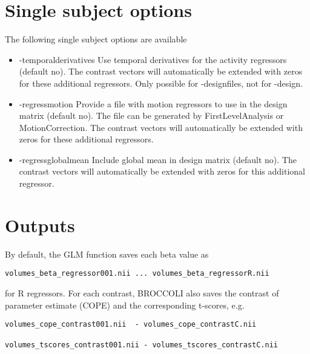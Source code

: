 \section{Single subject options}

The following single subject options are available

\begin{itemize}

\item -temporalderivatives
\newline \newline Use temporal derivatives for the activity regressors (default no). The contrast vectors will automatically be extended with zeros for these additional regressors. Only possible for -designfiles, not for -design.

\item -regressmotion
\newline \newline Provide a file with motion regressors to use in the design matrix (default no). The file can be generated by FirstLevelAnalysis or MotionCorrection. The contrast vectors will automatically be extended with zeros for these additional regressors.

\item -regressglobalmean
\newline \newline Include global mean in design matrix (default no). The contrast vectors will automatically be extended with zeros for this additional regressor.


\end{itemize}


\section{Outputs}

By default, the GLM function saves each beta value as 

\begin{verbatim}
volumes_beta_regressor001.nii ... volumes_beta_regressorR.nii
\end{verbatim}
for R regressors. For each contrast, BROCCOLI also saves the contrast of parameter estimate (COPE) and the corresponding t-scores, e.g.

\begin{verbatim}
volumes_cope_contrast001.nii  - volumes_cope_contrastC.nii

volumes_tscores_contrast001.nii - volumes_tscores_contrastC.nii
\end{verbatim}

